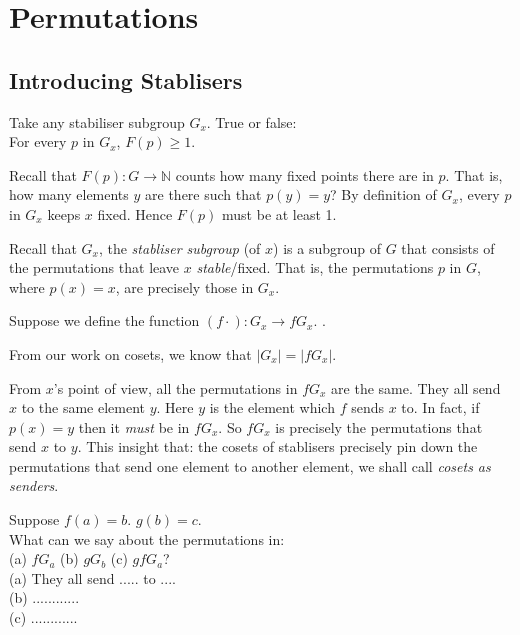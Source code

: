 
\chapter{Permutations}



\section{Introducing Stablisers}


\begin{example}
Take any stabiliser subgroup $G_x$. True or false: \\
For every $p$ in $G_x$, $F(p) \geqslant 1$.

Recall that $F(p) : G \rightarrow \mathbb{N}$ counts how 
many fixed points there are in $p$. That is, how many elements 
$y$ are there such that $p(y) = y$? 
By definition of $G_x$, every $p$ in $G_x$ keeps 
$x$ fixed. Hence $F(p)$ must be at least 1.
\end{example}

\frmrule

Recall that $G_x$, the \textit{stabliser subgroup} (of $x$) is a subgroup of $G$ that consists 
of the permutations that leave $x$ \textit{stable}/fixed. That is, the permutations $p$ in $G$, 
where $p(x) = x$, are precisely those in $G_x$. 

Suppose we define the function $(f\cdot) : G_x \rightarrow fG_x$.
.

From our work on cosets, we know that $|G_x| = |fG_x|$. 


From $x$'s point of view, all the permutations in $fG_x$ are the same. 
They all send $x$ to the same element $y$. Here $y$ is the element which $f$ sends $x$ to. 
In fact, if $p(x) = y$ then it \textit{must} be in $fG_x$. 
So $fG_x$ is precisely the permutations that send $x$ to $y$. 
This insight that: the cosets of stablisers precisely pin down the permutations 
that send one element to another element, we shall call \textit{cosets as senders}. 

\frmrule

\begin{example}
Suppose $f(a) = b$. $g(b) = c$. \\
What can we say about the permutations in: \\
(a) $fG_a$ (b) $gG_b$ (c) $gfG_a$? \\

(a) They all send ..... to .... \\
(b) ............\\
(c) ............\\
\end{example}

